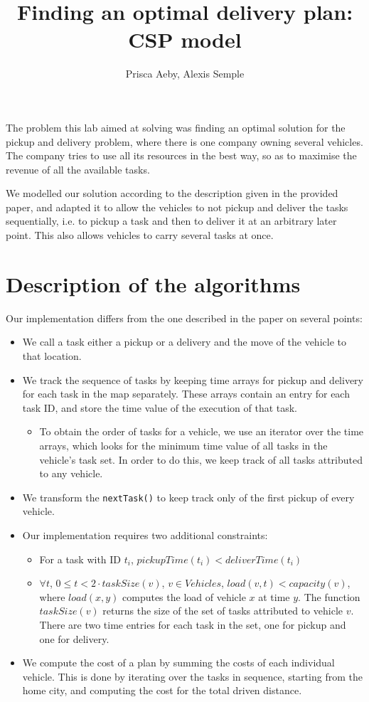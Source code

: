 \documentclass[12pt,a4paper]{article}
\author{Prisca Aeby, Alexis Semple}
\title{Finding an optimal delivery plan: CSP model}
\date{}
\begin{document}
\maketitle

The problem this lab aimed at solving was finding an optimal solution for the pickup and delivery problem, where there is one company owning several vehicles. The company tries to use all its resources in the best way, so as to maximise the revenue of all the available tasks.

We modelled our solution according to the description given in the provided paper, and adapted it to allow the vehicles to not pickup and deliver the tasks sequentially, i.e. to pickup a task and then to deliver it at an arbitrary later point. This also allows vehicles to carry several tasks at once. 

\section{Description of the algorithms}
Our implementation differs from the one described in the paper on several points:
\begin{itemize}
\item We call a task either a pickup or a delivery and the move of the vehicle to that location.
\item We track the sequence of tasks by keeping time arrays for pickup and delivery for each task in the map separately. These arrays contain an entry for each task ID, and store the time value of the execution of that task.
\begin{itemize}
\item To obtain the order of tasks for a vehicle, we use an iterator over the time arrays, which looks for the minimum time value of all tasks in the vehicle's task set. In order to do this, we keep track of all tasks attributed to any vehicle.
\end{itemize}
\item We transform the \texttt{nextTask()} to keep track only of the first pickup of every vehicle.

\item Our implementation requires two additional constraints:
\begin{itemize}
\item For a task with ID $t_i$, $pickupTime(t_i) < deliverTime(t_i)$
\item $\forall t$, $0 \leq t < 2\cdot taskSize(v)$, $v \in Vehicles$, $load(v, t) < capacity(v)$, where $load(x, y)$ computes the load of vehicle $x$ at time $y$. The function $taskSize(v)$ returns the size of the set of tasks attributed to vehicle $v$. There are two time entries for each task in the set, one for pickup and one for delivery.
\end{itemize}
\item We compute the cost of a plan by summing the costs of each individual vehicle. This is done by iterating over the tasks in sequence, starting from the home city, and computing the cost for the total driven distance.
\end{itemize}
\end{document}
